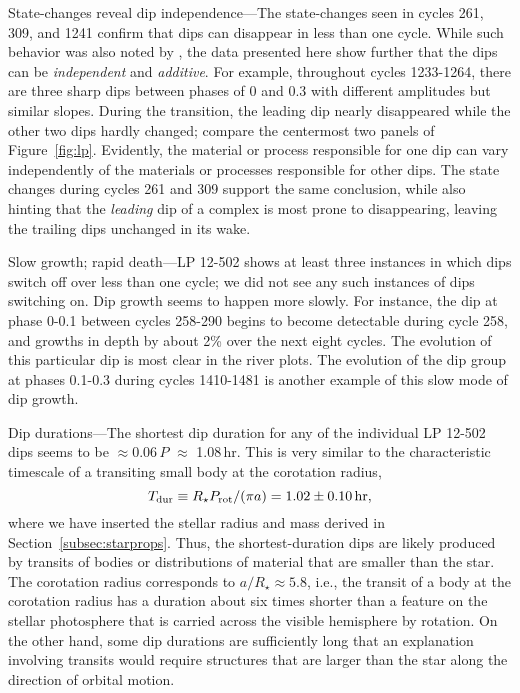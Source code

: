 \documentclass[11pt,twocolumn,tighten]{aastex63}
\begin{document}
{\sc State-changes reveal dip independence}---The state-changes seen
in cycles 261, 309, and 1241 confirm that dips can disappear in less
than one cycle. While such behavior was also noted by
\cite{2017AJ....153..152S}, the data presented here show further that
the dips can be {\it independent} and {\it additive}.  For example,
throughout cycles 1233-1264, there are three sharp dips between phases
of 0 and 0.3 with different amplitudes but similar slopes.  During the
transition, the leading dip nearly disappeared while the other two
dips hardly changed; compare the centermost two panels of
Figure~\ref{fig:lp}.  Evidently, the material or process responsible
for one dip can vary independently of the materials or processes
responsible for other dips.  The state changes during cycles 261 and
309 support the same conclusion, while also hinting that the {\it
leading} dip of a complex is most prone to disappearing, leaving the
trailing dips unchanged in its wake.


{\sc Slow growth; rapid death}---LP 12-502 shows at least three
instances in which dips switch off over less than one cycle; we did
not see any such instances of dips switching on.  Dip growth seems to
happen more slowly.  For instance, the dip at phase 0-0.1 between
cycles 258-290 begins to become detectable during cycle 258, and
growths in depth by about 2\% over the next eight cycles.  The
evolution of this particular dip is most clear in the river plots.
The evolution of the dip group at phases 0.1-0.3 during cycles
1410-1481 is another example of this slow mode of dip growth.

{\sc Dip durations}---The shortest dip duration for any of the
individual LP 12-502 dips seems to be $\approx$0.06\,$P$ $\approx$
1.08\,hr.  This is very similar to the characteristic timescale of a
transiting small body at the corotation radius,
\begin{equation}
T_{\rm dur} \equiv R_\star P_{\rm rot} / (\pi a) = 1.02\pm 0.10\,{\rm hr},
\end{equation}
where we have inserted the stellar radius and mass derived in
Section~\ref{subsec:starprops}.  Thus, the shortest-duration dips are
likely produced by transits of bodies or distributions of material
that are smaller than the star.  The corotation radius corresponds to
$a/R_\star \approx 5.8$, i.e., the transit of a body at the corotation
radius has a duration about six times shorter than a feature on the
stellar photosphere that is carried across the visible hemisphere by
rotation.  On the other hand, some dip durations are sufficiently long
that an explanation involving transits would require structures that
are larger than the star along the direction of orbital motion.
\end{document}
